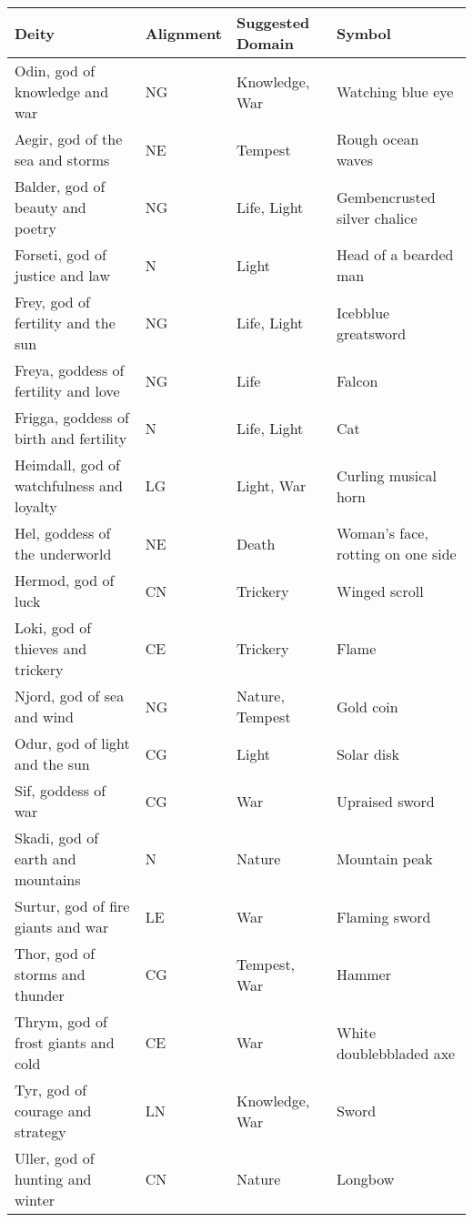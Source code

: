 \documentclass[
]{article}
\begin{document}
\begin{longtable}[]{@{}llll@{}}
\toprule
Deity & Alignment & Suggested Domain & Symbol\tabularnewline
\midrule
\endhead
Odin, god of knowledge and war & NG & Knowledge, War & Watching blue
eye\tabularnewline
Aegir, god of the sea and storms & NE & Tempest & Rough ocean
waves\tabularnewline
Balder, god of beauty and poetry & NG & Life, Light & Gembencrusted
silver chalice\tabularnewline
Forseti, god of justice and law & N & Light & Head of a bearded
man\tabularnewline
Frey, god of fertility and the sun & NG & Life, Light & Icebblue
greatsword\tabularnewline
Freya, goddess of fertility and love & NG & Life & Falcon\tabularnewline
Frigga, goddess of birth and fertility & N & Life, Light &
Cat\tabularnewline
Heimdall, god of watchfulness and loyalty & LG & Light, War & Curling
musical horn\tabularnewline
Hel, goddess of the underworld & NE & Death & Woman's face, rotting on
one side\tabularnewline
Hermod, god of luck & CN & Trickery & Winged scroll\tabularnewline
Loki, god of thieves and trickery & CE & Trickery & Flame\tabularnewline
Njord, god of sea and wind & NG & Nature, Tempest & Gold
coin\tabularnewline
Odur, god of light and the sun & CG & Light & Solar disk\tabularnewline
Sif, goddess of war & CG & War & Upraised sword\tabularnewline
Skadi, god of earth and mountains & N & Nature & Mountain
peak\tabularnewline
Surtur, god of fire giants and war & LE & War & Flaming
sword\tabularnewline
Thor, god of storms and thunder & CG & Tempest, War &
Hammer\tabularnewline
Thrym, god of frost giants and cold & CE & War & White doublebbladed
axe\tabularnewline
Tyr, god of courage and strategy & LN & Knowledge, War &
Sword\tabularnewline
Uller, god of hunting and winter & CN & Nature & Longbow\tabularnewline
\bottomrule
\end{longtable}
\end{document}
